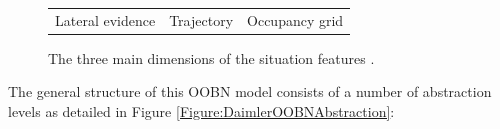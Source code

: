 \begin{figure}[ht!]
\begin{center}
\begin{tabular}{ccc}
Lateral evidence & Trajectory & Occupancy grid \\
\end{tabular}
\caption{\label{Figure:DaimlerSituationFeatures} The three main dimensions of the situation features \cite{kasper2012object}.}
\end{center}
\end{figure}


The general structure of this OOBN model consists of a number of abstraction levels as detailed in Figure \ref{Figure:DaimlerOOBNAbstraction}: 

